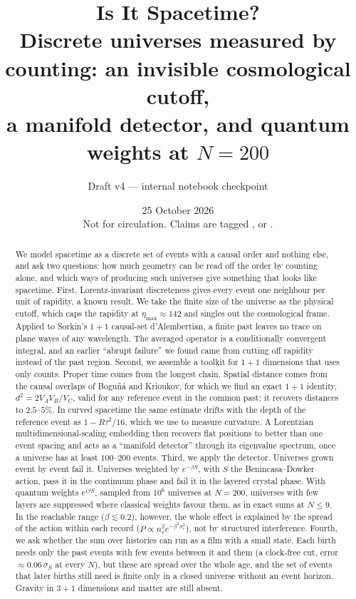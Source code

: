 \documentclass[11pt,a4paper]{article}
\title{Is It Spacetime?\\[4pt]
\large Discrete universes measured by counting: an invisible cosmological cutoff,\\ a manifold detector, and quantum weights at $N=200$}
\author{Draft v4 --- internal notebook checkpoint}
\date{25 October 2026\\[2pt]\small Not for circulation. Claims are tagged \est, \lit{} or \ours.}
\begin{document}
\maketitle

\begin{abstract}
We model spacetime as a discrete set of events with a causal order and nothing else, and ask two questions: how much geometry can be read off the order by counting alone, and which ways of producing such universes give something that looks like spacetime. First, Lorentz-invariant discreteness gives every event one neighbour per unit of rapidity, a known result. We take the finite size of the universe as the physical cutoff, which caps the rapidity at $\eta_{\max}\approx142$ and singles out the cosmological frame. Applied to Sorkin's $1+1$ causal-set d'Alembertian, a finite past leaves no trace on plane waves of any wavelength. The averaged operator is a conditionally convergent integral, and an earlier ``abrupt failure'' we found came from cutting off rapidity instead of the past region. Second, we assemble a toolkit for $1+1$ dimensions that uses only counts. Proper time comes from the longest chain. Spatial distance comes from the causal overlaps of Boguñá and Krioukov, for which we find an exact $1+1$ identity, $d^2=2V_AV_B/V_C$, valid for any reference event in the common past; it recovers distances to $2.5$--$5\%$. In curved spacetime the same estimate drifts with the depth of the reference event as $1-R\tau^2/16$, which we use to measure curvature. A Lorentzian multidimensional-scaling embedding then recovers flat positions to better than one event spacing and acts as a ``manifold detector'' through its eigenvalue spectrum, once a universe has at least $100$--$200$ events. Third, we apply the detector. Universes grown event by event fail it. Universes weighted by $e^{-\beta S}$, with $S$ the Benincasa--Dowker action, pass it in the continuum phase and fail it in the layered crystal phase. With quantum weights $e^{i\beta S}$, sampled from $10^6$ universes at $N=200$, universes with few layers are suppressed where classical weights favour them, as in exact sums at $N\le9$. In the reachable range ($\beta\lesssim0.2$), however, the whole effect is explained by the spread of the action within each record ($P\propto n_r^2e^{-\beta^2\sigma_r^2}$), not by structured interference. Fourth, we ask whether the sum over histories can run as a film with a small state. Each birth needs only the past events with few events between it and them (a clock-free cut, error $\approx0.06\,\sigma_S$ at every $N$), but these are spread over the whole age, and the set of events that later births still need is finite only in a closed universe without an event horizon. Gravity in $3+1$ dimensions and matter are still absent.
\end{abstract}
\end{document}
